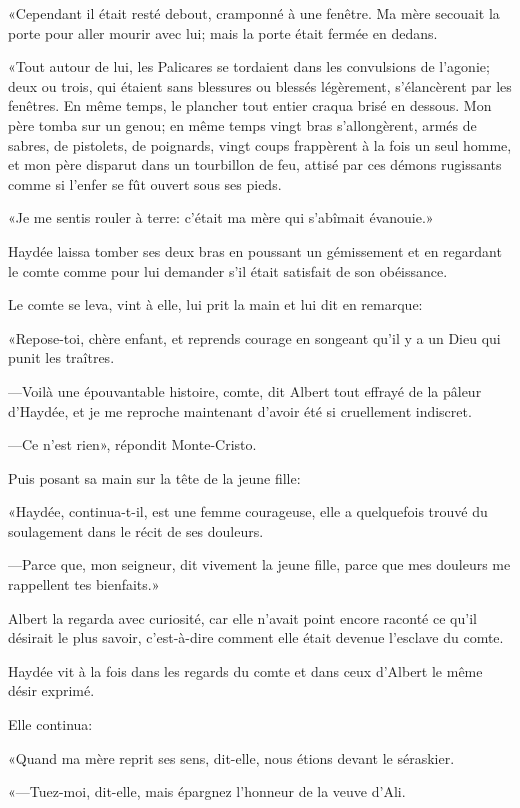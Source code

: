 «Cependant il était resté debout, cramponné à une fenêtre. Ma mère secouait la porte pour aller mourir avec lui; mais la porte était fermée en dedans. 

«Tout autour de lui, les Palicares se tordaient dans les convulsions de l'agonie; deux ou trois, qui étaient sans blessures ou blessés légèrement, s'élancèrent par les fenêtres. En même temps, le plancher tout entier craqua brisé en dessous. Mon père tomba sur un genou; en même temps vingt bras s'allongèrent, armés de sabres, de pistolets, de poignards, vingt coups frappèrent à la fois un seul homme, et mon père disparut dans un tourbillon de feu, attisé par ces démons rugissants comme si l'enfer se fût ouvert sous ses pieds. 

«Je me sentis rouler à terre: c'était ma mère qui s'abîmait évanouie.» 

Haydée laissa tomber ses deux bras en poussant un gémissement et en regardant le comte comme pour lui demander s'il était satisfait de son obéissance. 

Le comte se leva, vint à elle, lui prit la main et lui dit en remarque: 

«Repose-toi, chère enfant, et reprends courage en songeant qu'il y a un Dieu qui punit les traîtres. 

—Voilà une épouvantable histoire, comte, dit Albert tout effrayé de la pâleur d'Haydée, et je me reproche maintenant d'avoir été si cruellement indiscret. 

—Ce n'est rien», répondit Monte-Cristo. 

Puis posant sa main sur la tête de la jeune fille: 

«Haydée, continua-t-il, est une femme courageuse, elle a quelquefois trouvé du soulagement dans le récit de ses douleurs. 

—Parce que, mon seigneur, dit vivement la jeune fille, parce que mes douleurs me rappellent tes bienfaits.» 

Albert la regarda avec curiosité, car elle n'avait point encore raconté ce qu'il désirait le plus savoir, c'est-à-dire comment elle était devenue l'esclave du comte. 

Haydée vit à la fois dans les regards du comte et dans ceux d'Albert le même désir exprimé. 

Elle continua: 

«Quand ma mère reprit ses sens, dit-elle, nous étions devant le séraskier. 

«—Tuez-moi, dit-elle, mais épargnez l'honneur de la veuve d'Ali. 

